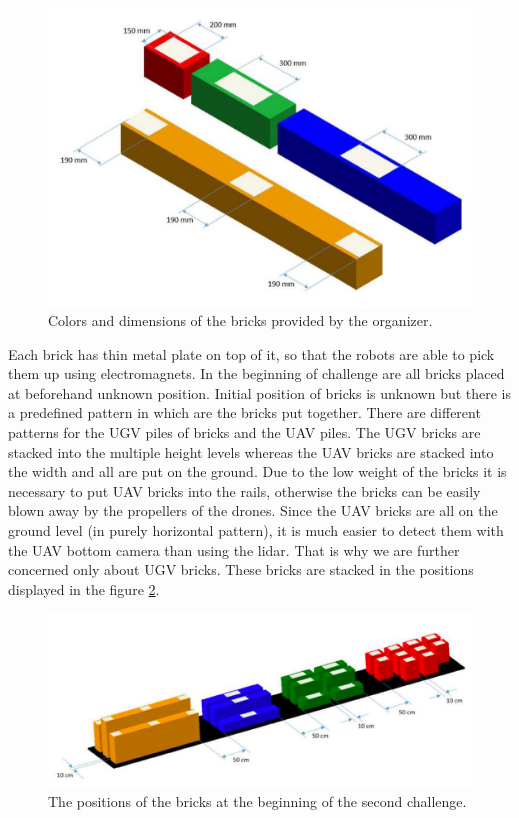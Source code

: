 \begin{figure}[H]

\centering
\includegraphics[scale=0.35]{fig/brick_sample.png}
\caption[Bricks definition]{Colors and dimensions of the bricks provided by the organizer.}
\label{fig:brickdef}

\end{figure}

Each brick has thin metal plate on top of it, so that the robots are able to pick them up using electromagnets. In the beginning of challenge are all bricks placed at beforehand unknown position. Initial position of bricks is unknown but there is a predefined pattern in which are the bricks put together. There are different patterns for the UGV piles of bricks and the UAV piles. The UGV bricks are stacked into the multiple height levels whereas the UAV bricks are stacked into the width and all are put on the ground. Due to the low weight of the bricks it is necessary to put UAV bricks into the rails, otherwise the bricks can be easily blown away by the propellers of the drones. Since the UAV bricks are all on the ground level (in purely horizontal pattern), it is much easier to detect them with the UAV bottom camera than using the lidar. That is why we are further concerned only about UGV bricks. These bricks are stacked in the positions displayed in the figure \ref{fig:piledef}.

\begin{figure}[H]

\centering
\includegraphics[scale=0.35]{fig/initial_layout.png}
\caption[Initial brick layout]{The positions of the bricks at the beginning of the second challenge.}
\label{fig:piledef}

\end{figure}

